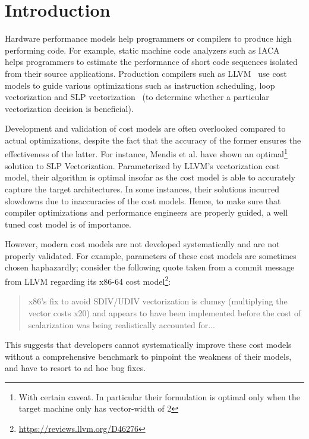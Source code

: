 \section{Introduction}

Hardware performance models help programmers or compilers to 
produce high performing code.
For example, static machine code analyzers such as IACA~\cite{iaca} helps programmers
to estimate the performance of short code sequences
isolated from their source applications.
Production compilers such as LLVM~\cite{llvm} use cost models to guide various optimizations such as instruction scheduling, loop
vectorization and SLP vectorization~\cite{slp} (to determine whether a particular vectorization decision is beneficial).

Development and validation of cost models are often overlooked compared to actual optimizations,
despite the fact that
the accuracy of the former ensures the effectiveness of the latter.
For instance, Mendis et al.\cite{goslp}
have shown an optimal\footnote{
With certain caveat.
In particular their formulation is optimal
only when the target machine only has vector-width of 2}
solution to SLP Vectorization\cite{slp}.
Parameterized by LLVM's vectorization cost model\cite{llvm-cost},
their algorithm is optimal insofar as the cost model is able to accurately 
capture the target architectures.
In some instances, their solutions incurred slowdowns due to inaccuracies of 
the cost models.
Hence, to make sure that compiler optimizations and performance engineers are properly guided,
a well tuned cost model is of importance.

However, modern cost models are not developed systematically and are not properly validated.
For example, parameters of these cost models 
are sometimes chosen haphazardly;
consider the following quote taken from a commit message from LLVM\cite{llvm}
regarding its x86-64 cost model\footnote{
\url{https://reviews.llvm.org/D46276}
}:
\begin{quote}
x86's fix to avoid SDIV/UDIV vectorization is clumsy
(multiplying the vector costs x20)
and appears to have been implemented before the cost of
scalarization was being realistically accounted for...
\end{quote}
This suggests that
developers cannot systematically improve these cost models
without a comprehensive benchmark to pinpoint the weakness of their models,
and have to resort to ad hoc bug fixes.

